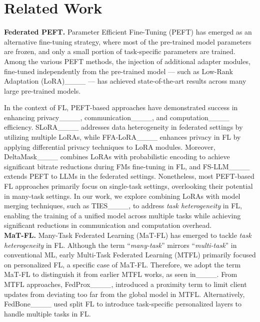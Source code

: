 \section{Related Work}
\noindent \textbf{Federated PEFT.} Parameter Efficient Fine-Tuning (PEFT) has emerged as an alternative fine-tuning strategy, where most of the pre-trained model parameters are frozen, and only a small portion of task-specific parameters are trained. Among the various PEFT methods, the injection of additional adapter modules, fine-tuned independently from the pre-trained model — such as Low-Rank Adaptation (LoRA)____ — has achieved state-of-the-art results across many large pre-trained models. 

In the context of FL, PEFT-based approaches have demonstrated success in enhancing privacy____, communication____, and computation____ efficiency. SLoRA____ addresses data heterogeneity in federated settings by utilizing multiple LoRAs, while FFA-LoRA____ enhances privacy in FL by applying differential privacy techniques to LoRA modules. Moreover, DeltaMask____ combines LoRAs with probabilistic encoding to achieve significant bitrate reductions during FMs fine-tuning in FL, and FS-LLM____ extends PEFT to LLMs in the federated settings. Nonetheless, most PEFT-based FL approaches primarily focus on single-task settings, overlooking their potential in many-task settings. In our work, we explore combining LoRAs with model merging techniques, such as TIES____, to address \textit{task heterogeneity} in FL, enabling the training of a unified model across multiple tasks while achieving significant reductions in communication and computation overhead. \\

\noindent \textbf{MaT-FL.} Many-Task Federated Learning (MaT-FL) has emerged to tackle \textit{task heterogeneity} in FL. Although the term ``\textit{many-task}'' mirrors ``\textit{multi-task}'' in conventional ML, early Multi-Task Federated Learning (MTFL) primarily focused on personalized FL, a specific case of MaT-FL. Therefore, we adopt the term MaT-FL to distinguish it from earlier MTFL works, as seen in____. From MTFL approaches, FedProx____, introduced a proximity term to limit client updates from deviating too far from the global model in MTFL. Alternatively, FedBone____ used split FL to introduce task-specific personalized layers to handle multiple tasks in FL.

